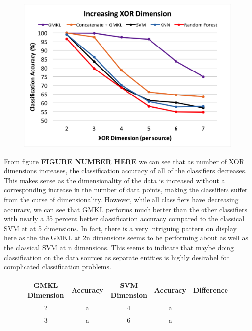 \documentclass{article}
\begin{document}
\begin{figure}[h]
\begin{center}
\includegraphics[scale=0.4]{experimentpic1.png}
\end{center}
\end{figure}


From figure \textbf{FIGURE NUMBER HERE}  we can see that as number of XOR dimensions increases, the classification accuracy of all of the classifiers decreases. This makes sense as the dimensionality of the data is increased without a corresponding increase in the number of data points, making the classifiers suffer from the curse of dimensionality. However, while all classifiers have decreasing accuracy, we can see that GMKL performs much better than the other classifiers with nearly a 35 percent better classification accuracy compared to the classical SVM at at 5 dimensions. In fact, there is a very intriguing pattern on display here as the the GMKL at 2n dimensions seems to be performing about as well as the classical SVM at n dimensions. This seems to indicate that maybe doing classification on the data sources as separate entities is highly desirabel for complicated classification problems. 

\begin{figure}
\begin{center}
\begin{tabular}{|c| c| c| c| c| }
\hline
GMKL Dimension & Accuracy & SVM Dimension & Accuracy & Difference\\
\hline
2 & a & 4 & a\\
\hline
3 & a & 6 &a
\end{tabular}
\end{center}
\end{figure}
\end{document}
